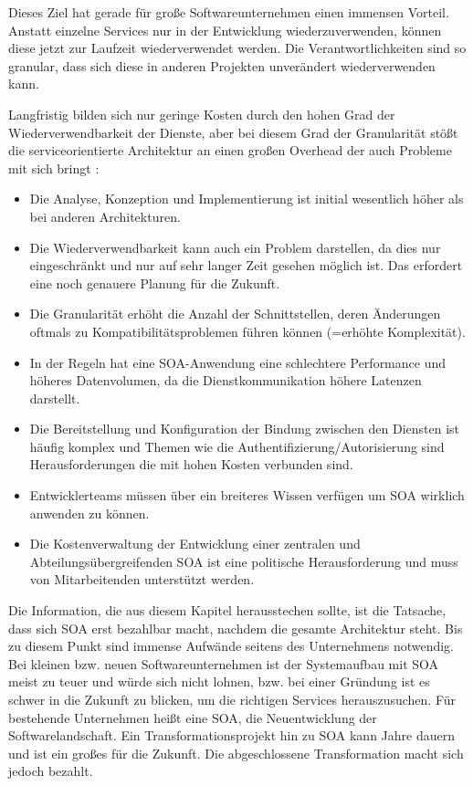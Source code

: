 Dieses Ziel hat gerade für große Softwareunternehmen einen immensen Vorteil. Anstatt einzelne Services nur in der Entwicklung wiederzuverwenden, können diese jetzt zur Laufzeit wiederverwendet werden. Die Verantwortlichkeiten sind so granular, dass sich diese in anderen Projekten unverändert wiederverwenden kann.

Langfristig bilden sich nur geringe Kosten durch den hohen Grad der Wiederverwendbarkeit der Dienste, aber bei diesem Grad der Granularität stößt die serviceorientierte Architektur an einen großen Overhead der auch Probleme mit sich bringt \cite{SolutionsMartinSchmidtAsgard.26.11.2022}:\begin{itemize}
    \item Die Analyse, Konzeption und Implementierung ist initial wesentlich höher als bei anderen Architekturen.
    \item Die Wiederverwendbarkeit kann auch ein Problem darstellen, da dies nur eingeschränkt und nur auf sehr langer Zeit gesehen möglich ist. Das erfordert eine noch genauere Planung für die Zukunft.
    \item Die Granularität erhöht die Anzahl der Schnittstellen, deren Änderungen oftmals zu Kompatibilitätsproblemen führen können (=erhöhte Komplexität).
    \item In der Regeln hat eine SOA-Anwendung eine schlechtere Performance und höheres Datenvolumen, da die Dienstkommunikation höhere Latenzen darstellt.
    \item Die Bereitstellung und Konfiguration der Bindung zwischen den Diensten ist häufig komplex und Themen wie die Authentifizierung/Autorisierung sind Herausforderungen die mit hohen Kosten verbunden sind.
    \item Entwicklerteams müssen über ein breiteres Wissen verfügen um SOA wirklich anwenden zu können.
    \item Die Kostenverwaltung der Entwicklung einer zentralen und Abteilungsübergreifenden SOA ist eine politische Herausforderung und muss von Mitarbeitenden unterstützt werden.
\end{itemize}

Die Information, die aus diesem Kapitel herausstechen sollte, ist die Tatsache, dass sich SOA erst bezahlbar macht, nachdem die gesamte Architektur steht. Bis zu diesem Punkt sind immense Aufwände seitens des Unternehmens notwendig. Bei kleinen bzw. neuen Softwareunternehmen ist der Systemaufbau mit SOA meist zu teuer und würde sich nicht lohnen, bzw. bei einer Gründung ist es schwer in die Zukunft zu blicken, um die richtigen Services herauszusuchen. Für bestehende Unternehmen heißt eine SOA, die Neuentwicklung der Softwarelandschaft. Ein Transformationsprojekt hin zu SOA kann Jahre dauern und ist ein großes  für die Zukunft. Die abgeschlossene Transformation macht sich jedoch bezahlt. 

